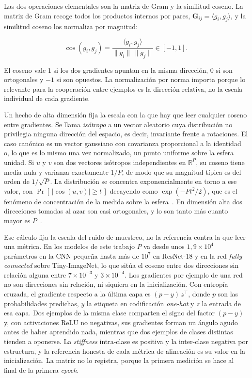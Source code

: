 Las dos operaciones elementales son la matriz de Gram y la similitud coseno. La matriz de Gram recoge todos los productos internos por pares, $\mathbf{G}_{ij} = \langle g_i, g_j\rangle$, y la similitud coseno los normaliza por magnitud:

\begin{equation}
\cos(g_i, g_j) = \frac{\langle g_i, g_j\rangle}{\|g_i\|\,\|g_j\|} \in [-1, 1].
\label{eq:cosine}
\end{equation}

El coseno vale $1$ si los dos gradientes apuntan en la misma dirección, $0$ si son ortogonales y $-1$ si son opuestos. La normalización por norma importa porque lo relevante para la cooperación entre ejemplos es la dirección relativa, no la escala individual de cada gradiente.

Un hecho de alta dimensión fija la escala con la que hay que leer cualquier coseno entre gradientes. Se llama \emph{isótropo} a un vector aleatorio cuya distribución no privilegia ninguna dirección del espacio, es decir, invariante frente a rotaciones. El caso canónico es un vector gaussiano con covarianza proporcional a la identidad o, lo que es lo mismo una vez normalizado, un punto uniforme sobre la esfera unidad. Si $u$ y $v$ son dos vectores isótropos independientes en $\mathbb{R}^P$, su coseno tiene media nula y varianza exactamente $1/P$, de modo que su magnitud típica es del orden de $1/\sqrt{P}$. La distribución se concentra exponencialmente en torno a ese valor, con $\Pr[\,|\cos(u,v)| \ge t\,]$ decayendo como $\exp(-P t^2 / 2)$, que es el fenómeno de concentración de la medida sobre la esfera~\cite{vershynin2018high}. En dimensión alta dos direcciones tomadas al azar son casi ortogonales, y lo son tanto más cuanto mayor es $P$~\cite{blum2020foundations}.

Ese cálculo fija la escala del ruido de muestreo, no la referencia contra la que leer una métrica. En los modelos de este trabajo $P$ va desde unos $1{,}9 \times 10^{4}$ parámetros en la CNN pequeña hasta más de $10^{7}$ en ResNet-18 y en la red \emph{fully connected} sobre Tiny-ImageNet, lo que sitúa el coseno entre dos direcciones sin relación alguna entre $7 \times 10^{-3}$ y $3 \times 10^{-4}$. Los gradientes por ejemplo de una red no son direcciones sin relación, ni siquiera en la inicialización. Con entropía cruzada, el gradiente respecto a la última capa es $(p - y)\,z^\top$, donde $p$ son las probabilidades predichas, $y$ la etiqueta en codificación \emph{one-hot} y $z$ la entrada de esa capa. Dos ejemplos de la misma clase comparten el signo del factor $(p - y)$ y, con activaciones ReLU no negativas, sus gradientes forman un ángulo agudo antes de haber aprendido nada, mientras que dos ejemplos de clases distintas tienden a oponerse. La \emph{stiffness} intra-clase es positiva y la inter-clase negativa por estructura, y la referencia honesta de cada métrica de alineación es su valor en la inicialización. La matriz no lo registra, porque la primera medición se hace al final de la primera \emph{epoch}.

